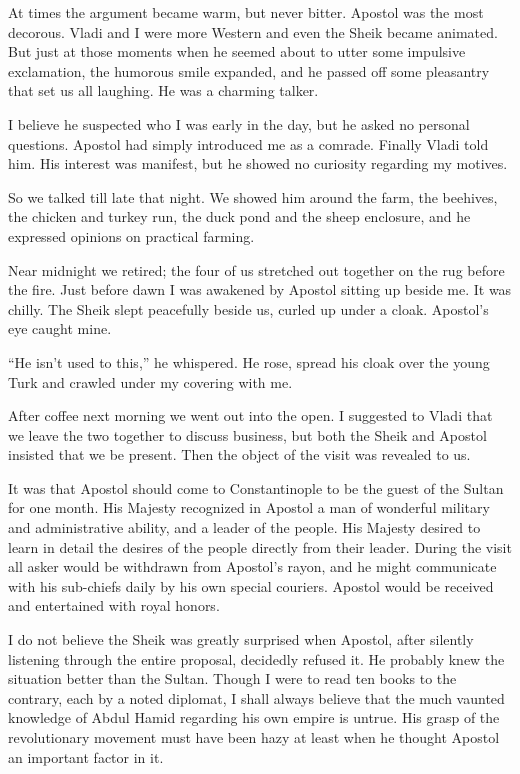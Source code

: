 \documentclass[a5paper,12pt]{book}
\begin{document}
At times the argument became warm, but never bitter. Apostol was the most decorous. Vladi and I were more Western and even the Sheik became animated. But just at those moments when he seemed about to utter some impulsive exclamation, the humorous smile expanded, and he passed off some pleasantry that set us all laughing. He was a charming talker. 

I believe he suspected who I was early in the day, but he asked no personal questions. Apostol had simply introduced me as a comrade. Finally Vladi told him. His interest was manifest, but he showed no curiosity regarding my motives. 

So we talked till late that night. We showed him around the farm, the beehives, the chicken and turkey run, the duck pond and the sheep enclosure, and he expressed opinions on practical farming. 

Near midnight we retired; the four of us stretched out together on the rug before the fire. Just before dawn I was awakened by Apostol sitting up beside me. It was chilly. The Sheik slept peacefully beside us, curled up under a cloak. Apostol’s eye caught mine. 

“He isn’t used to this,” he whispered. He rose, spread his cloak over the young Turk and crawled under my covering with me. 

After coffee next morning we went out into the open. I suggested to Vladi that we leave the two together to discuss business, but both the Sheik and Apostol insisted that we be present. Then the object of the visit was revealed to us. 

It was that Apostol should come to Constantinople to be the guest of the Sultan for one month. His Majesty recognized in Apostol a man of wonderful military and administrative ability, and a leader of the people. His Majesty desired to learn in detail the desires of the people directly from their leader. During the visit all asker would be withdrawn from Apostol’s rayon, and he might communicate with his sub-chiefs daily by his own special couriers. Apostol would be received and entertained with royal honors. 

I do not believe the Sheik was greatly surprised when Apostol, after silently listening through the entire proposal, decidedly refused it. He probably knew the situation better than the Sultan. Though I were to read ten books to the contrary, each by a noted diplomat, I shall always believe that the much vaunted knowledge of Abdul Hamid regarding his own empire is untrue. His grasp of the revolutionary movement must have been hazy at least when he thought Apostol an important factor in it. 
\end{document}
